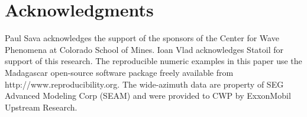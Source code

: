 \section{Acknowledgments}
Paul Sava acknowledges the support of the sponsors of the Center for
Wave Phenomena at Colorado School of Mines. Ioan Vlad acknowledges
Statoil for support of this research.
%
The reproducible numeric examples in this paper use the Madagascar
open-source software package freely available from
http://www.reproducibility.org.
%
The
wide-azimuth data are property of SEG Advanced Modeling Corp (SEAM) and
were provided to CWP by ExxonMobil Upstream Research.
%
